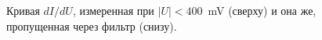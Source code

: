 \documentclass[a4paper, 12pt]{article}
\begin{document}
	\begin{figure}[H]
		\centering
		\caption{Кривая $dI/dU$, измеренная при $|U| < 400$~mV (сверху) и она же, пропущенная через фильтр (снизу).}
		\label{fig:3_STS}
	\end{figure}
	
	
	
	
	
	
	
	
	
	
	
	
	
	
	
	
	
	
	
	
	
	
	
	
	
	
	
	
	
	
	
	
	
	
\end{document}

